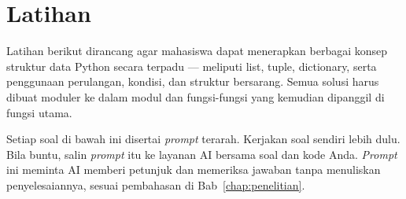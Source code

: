 \section{Latihan}
Latihan berikut dirancang agar mahasiswa dapat menerapkan berbagai konsep struktur data Python 
secara terpadu — meliputi list, tuple, dictionary, serta penggunaan perulangan, kondisi, dan struktur bersarang. Semua solusi harus dibuat moduler ke dalam modul dan fungsi-fungsi yang kemudian dipanggil di fungsi utama. 

Setiap soal di bawah ini disertai \textit{prompt} terarah. Kerjakan soal sendiri lebih dulu. Bila buntu, salin \textit{prompt} itu ke layanan AI bersama soal dan kode Anda. \textit{Prompt} ini meminta AI memberi petunjuk dan memeriksa jawaban tanpa menuliskan penyelesaiannya, sesuai pembahasan di Bab~\ref{chap:penelitian}.

